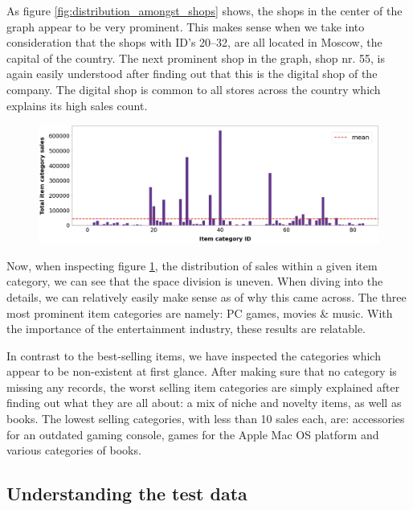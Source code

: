 As figure \ref{fig:distribution_amongst_shops} shows, the shops in the center of the graph appear to be very prominent. This makes sense when we take into consideration that the shops with ID's 20--32, are all located in Moscow, the capital of the country.
The next prominent shop in the graph, shop nr. 55, is again easily understood after finding out that this is the digital shop of the company. The digital shop is common to all stores across the country which explains its high sales count.

\begin{figure}[h]
  \centering
  \includegraphics[width=0.9\linewidth]{external_content/graphs/distribution_across_item_categories.png}
  \captionsetup{justification=centering}
  \label{fig:distribution_amongst_item_categories}
\end{figure}

Now, when inspecting figure \ref{fig:distribution_amongst_item_categories}, the distribution of sales within a given item category, we can see that the space division is uneven. When diving into the details, we can relatively easily make sense as of why this came across.
The three most prominent item categories are namely: PC games, movies \& music. With the importance of the entertainment industry, these results are relatable.

In contrast to the best-selling items, we have inspected the categories which appear to be non-existent at first glance. After making sure that no category is missing any records, the worst selling item categories are simply explained after finding out what they are all about: a mix of niche and novelty items, as well as books. The lowest selling categories, with less than 10 sales each, are: accessories for an outdated gaming console, games for the Apple Mac OS platform and various categories of books.

\subsection{Understanding the test data} \label{sec:testdata}

